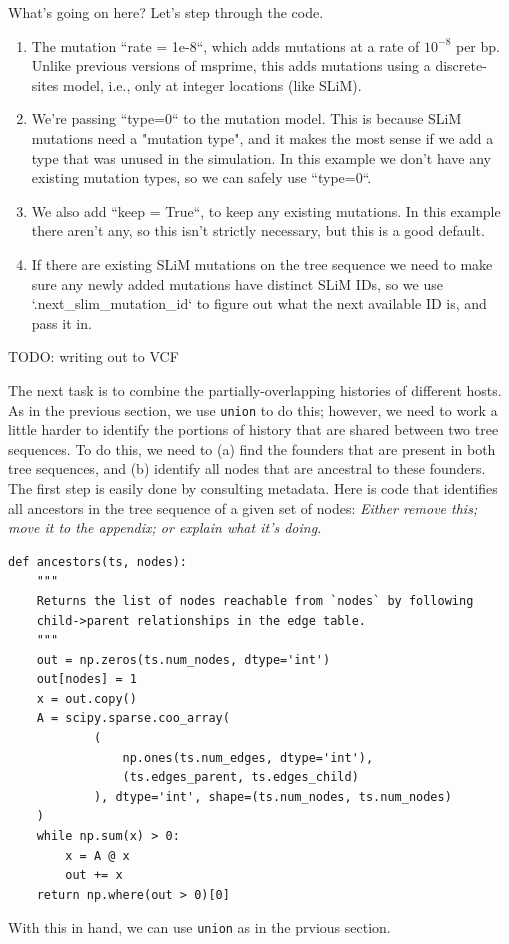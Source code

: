 \documentclass[12pt]{article}
\newcommand{\comment}[1]{\textit{\color{green} #1}}
\begin{document}
What's going on here? Let's step through the code.

\begin{enumerate}
    \item The mutation ``rate = 1e-8``, which adds mutations at a rate of $10^{-8}$ per bp.
    Unlike previous versions of msprime, this adds mutations using a discrete-sites model,
    i.e., only at integer locations (like SLiM).

\item We're passing ``type=0`` to the mutation model.
    This is because SLiM mutations need a "mutation type",
    and it makes the most sense if we add a type that was unused in the simulation.
    In this example we don't have any existing mutation types, so we can safely use ``type=0``.

\item We also add ``keep = True``, to keep any existing mutations.
    In this example there aren't any, so this isn't strictly necessary,
    but this is a good default.

\item If there are existing SLiM mutations on the tree sequence we need to
    make sure any newly added mutations have distinct SLiM IDs,
    so we use `.next\_slim\_mutation\_id` to figure out
    what the next available ID is, and pass it in.

\end{enumerate}

TODO: writing out to VCF

The next task is to combine the partially-overlapping histories of different hosts.
As in the previous section, we use \verb|union| to do this;
however, we need to work a little harder
to identify the portions of history that are shared between two tree sequences.
To do this, we need to
(a) find the founders that are present in both tree sequences,
and (b) identify all nodes that are ancestral to these founders.
The first step is easily done by consulting metadata.
Here is code that identifies all ancestors in the tree sequence
of a given set of nodes:
\comment{Either remove this; move it to the appendix; or explain what it's doing.}
\begin{verbatim}
def ancestors(ts, nodes):
    """
    Returns the list of nodes reachable from `nodes` by following
    child->parent relationships in the edge table.
    """
    out = np.zeros(ts.num_nodes, dtype='int')
    out[nodes] = 1
    x = out.copy()
    A = scipy.sparse.coo_array(
            (
                np.ones(ts.num_edges, dtype='int'),
                (ts.edges_parent, ts.edges_child)
            ), dtype='int', shape=(ts.num_nodes, ts.num_nodes)
    )
    while np.sum(x) > 0:
        x = A @ x
        out += x
    return np.where(out > 0)[0]
\end{verbatim}
With this in hand, we can use \verb|union|
as in the prvious section.
\end{document}
